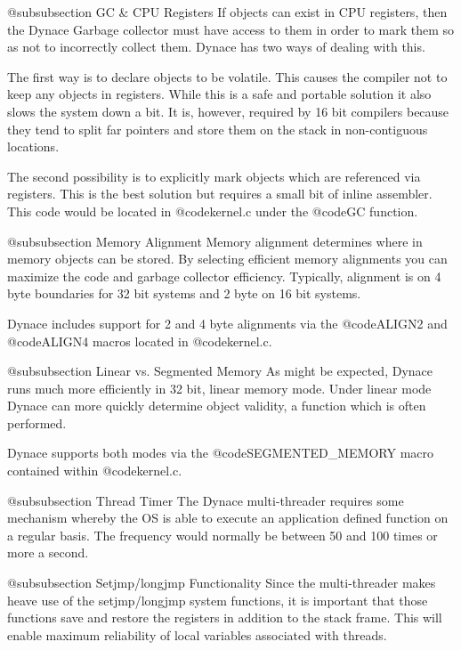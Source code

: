 @subsubsection  GC & CPU Registers
If objects can exist in CPU registers, then the Dynace Garbage collector must
have access to them in order to mark them so as not to incorrectly collect
them.  Dynace has two ways of dealing with this.

The first way is to declare objects to be volatile.  This causes the
compiler not to keep any objects in registers.  While this is a safe
and portable solution it also slows the system down a bit.  It is,
however, required by 16 bit compilers because they tend to split
far pointers and store them on the stack in non-contiguous locations.

The second possibility is to explicitly mark objects which are
referenced via registers.  This is the best solution but requires
a small bit of inline assembler.  This code would be located in
@code{kernel.c} under the @code{GC} function.

@subsubsection Memory Alignment
Memory alignment determines where in memory objects can be stored.
By selecting efficient memory alignments you can maximize the code
and garbage collector efficiency.  Typically, alignment is on
4 byte boundaries for 32 bit systems and 2 byte on 16 bit systems.

Dynace includes support for 2 and 4 byte alignments via the
@code{ALIGN2} and @code{ALIGN4} macros located in @code{kernel.c}.


@subsubsection  Linear vs. Segmented Memory
As might be expected, Dynace runs much more efficiently in 32 bit,
linear memory mode.  Under linear mode Dynace can more quickly determine
object validity, a function which is often performed.

Dynace supports both modes via the @code{SEGMENTED_MEMORY} macro
contained within @code{kernel.c}.


@subsubsection Thread Timer
The Dynace multi-threader requires some mechanism whereby the OS
is able to execute an application defined function on a regular
basis.  The frequency would normally be between 50 and 100 times or
more a second.

@subsubsection Setjmp/longjmp Functionality
Since the multi-threader makes heave use of the setjmp/longjmp
system functions, it is important that those functions save and
restore the registers in addition to the stack frame.  This will
enable maximum reliability of local variables associated with
threads.
